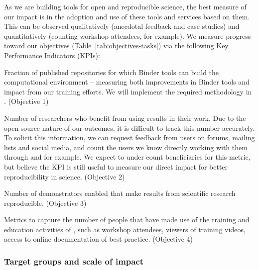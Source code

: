 As we are building tools for open and reproducible science, the best measure of our impact
is in the adoption and use of these tools and services based on them. This can be observed
qualitatively (anecdotal feedback and case studies) and quantitatively (counting workshop
attendees, for example).
%
%
We measure progress toward our objectives (Table~\ref{tab:objectives-tasks})
via the following Key Performance Indicators (KPIs):
\begin{compactenum}
\item \label{kpi:reproducibility} Fraction of published repositories for
  which Binder tools can build the computational environment -- measuring both
  improvements in Binder tools and impact from our training efforts. We will
  implement the required methodology in
  . (Objective 1)
\item \label{kpi:broaden} Number of researchers who benefit from using
  \TheProject{} results in their work. Due to the open source nature of our
  outcomes, it is difficult to track this number accurately. To solicit this
  information, we can request feedback from users on forums, mailing lists and
  social media, and count the users we know directly working with
  them through  and  for example. We expect
  to under count beneficiaries for this metric, but believe the KPI is still useful
  to measure our direct impact for better reproducibility in science. (Objective 2)
\item \label{kpi:demonstrators} Number of demonstrators enabled that make
  results from scientific research reproducible. (Objective 3)
\item \label{kpi:education} Metrics to capture the number of people that have
  made use of the training and education activities of \TheProject{}, such as
  workshop attendees, viewers of training videos, access to online documentation
  of best practice. (Objective 4)%
\end{compactenum}


\subsubsection{Target groups and scale of impact}\label{sec:target-groups-and-scale-of-impact}

